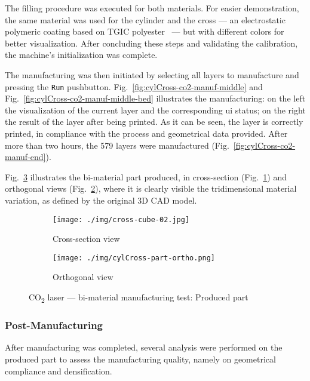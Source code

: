 The filling procedure was executed for both materials. 
For easier
demonstration, the same material was used for the cylinder and the cross --- an electrostatic polymeric coating
based on TGIC polyester~\cite{eastwoodPowder} --- but with different colors for better visualization.
After concluding these
steps and validating the calibration, the machine's initialization was complete.

The manufacturing was then initiated by selecting all layers to manufacture and
pressing the \texttt{Run} pushbutton. 
Fig.~\ref{fig:cylCross-co2-manuf-middle} and Fig.~\ref{fig:cylCross-co2-manuf-middle-bed} illustrates the manufacturing: on the left the visualization
of the current layer and the corresponding \gls{ui} status; on the right the
result of the layer after being printed. As it can be seen, the layer is
correctly printed, in compliance with the process and geometrical data provided.
After more than two hours, the 579 layers were manufactured (Fig.~\ref{fig:cylCross-co2-manuf-end}).

Fig.~\ref{fig:cylCross-co2-produced-part} illustrates the bi-material part produced, in
cross-section (Fig.~\ref{fig:cylCross-co2-part-crossSection}) and orthogonal views (Fig.~\ref{fig:cylCross-co2-part-ortho}), where it is clearly visible the
tridimensional material variation, as defined by the original 3D CAD
model.

%
\begin{figure}[hbtp!]
  \centering
  \begin{subfigure}[t]{.48\textwidth}
    \texttt{[image: ./img/cross-cube-02.jpg]}
  \caption{Cross-section view}%
  \label{fig:cylCross-co2-part-crossSection}
  \end{subfigure}
%
  \centering
  \begin{subfigure}[t]{.48\textwidth}
  \centering
    \texttt{[image: ./img/cylCross-part-ortho.png]}
  \caption{Orthogonal view}%
  \label{fig:cylCross-co2-part-ortho}
  \end{subfigure}
  \caption{CO\textsubscript{2} laser --- bi-material manufacturing test:
    Produced part}%
  \label{fig:cylCross-co2-produced-part}
\end{figure}

\subsubsection{Post-Manufacturing}%
\label{sec:post-manufacturing-co2}
After manufacturing was completed, several analysis were performed on the
produced part to assess the manufacturing quality, namely on geometrical
compliance and densification.

